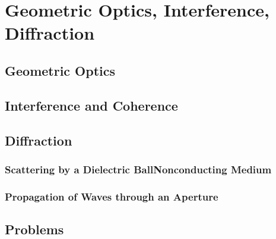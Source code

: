 \setcounter{chapter}{0}
\renewcommand{\thechapter}{7}
\chapter{Geometric Optics, Interference, Diffraction}\label{ch:7}
\setcounter{equation}{0}	        %

\section{Geometric Optics}

\section{Interference and Coherence}

\section{Diffraction}

\subsection{Scattering by a Dielectric BallNonconducting Medium}

\subsection{Propagation of Waves through an Aperture}


\section*{Problems}


